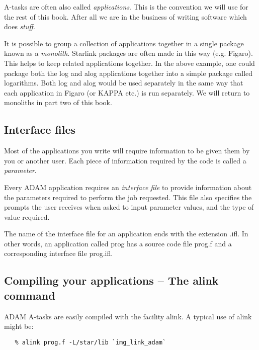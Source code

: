        A-tasks are often also called {\it applications}. This is the
       convention we will use for the rest of this book. After all
       we are in the business of writing software which
       does {\em stuff}.

       It is possible to group a collection of applications together in a
       single package known as a {\it monolith}. Starlink packages
       are often made in this way (e.g. Figaro). This helps to keep related
       applications together. In the above example, one could package
       both the {\sf log} and {\sf alog} applications together
       into a simple package called {\sf logarithms}. Both {\sf log} and
       {\sf alog} would be used separately in the same way that each
       application in {\sf Figaro} (or {\sf KAPPA} etc.) is run
       separately. We will return to monoliths in part two of this book.

\subsection{Interface files}

       Most of the applications you write will require information to
       be given them by you or another user. Each piece of information
       required by the code is called a {\it parameter}.

       Every ADAM application requires an {\it interface file} to provide
       information about the parameters required to
       perform the job requested. This file also specifies the
       prompts the user receives when asked to input parameter values,
       and the type of value required.

       The name of the interface file for an application ends with the
       extension {\sf .ifl}. In other words, an application called {\sf prog}
       has a source code file {\sf prog.f} and a corresponding interface file
       {\sf prog.ifl}.

\subsection{Compiling your applications -- The alink command}

ADAM A-tasks are easily compiled with the facility {\sf alink}.
A typical use of {\sf alink} might be:

\begin{verbatim}
   % alink prog.f -L/star/lib `img_link_adam`
\end{verbatim}

